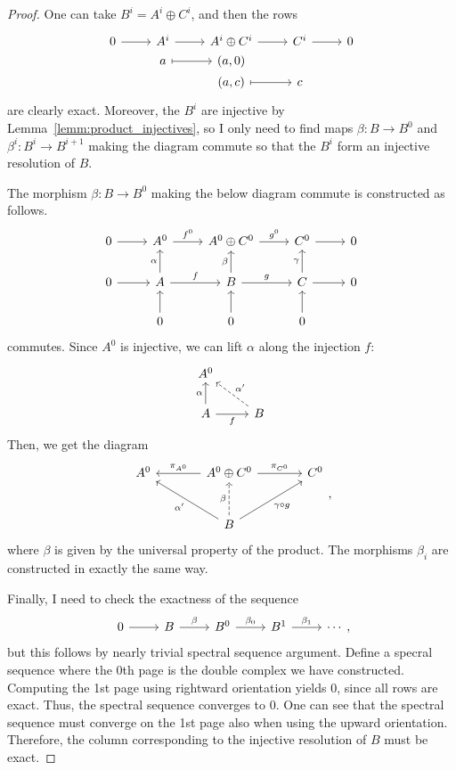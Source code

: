 \begin{proof}
  One can take $B^{i}=A^{i}\oplus C^{i}$, and then the rows
  \[\begin{tikzcd}[row sep=0]
      0\rar & A^{i}\rar & A^{i}\oplus C^{i}\rar & C^{i}\rar & 0 \\
      & a\rar[mapsto] & (a, 0) && \\
      && (a, c)\rar[mapsto] & c &
    \end{tikzcd}\]
  are clearly exact. Moreover, the $B^{i}$ are injective by
  Lemma~\ref{lemm:product_injectives}, so I only need to find maps
  $\beta:B\to B^{0}$ and $\beta^{i}:B^{i}\to B^{i+1}$ making the diagram
  commute so that the $B^{i}$ form an injective resolution of $B$.

  The morphism $\beta:B\to B^{0}$ making the below diagram commute is
  constructed as follows.
  \[\begin{tikzcd}
      0\rar & A^{0}\rar{f^{0}} & A^{0}\oplus C^{0}\rar{g^{0}} & C^{0}\rar & 0 \\
      0\rar & A\rar{f}\uar{\alpha} & B\rar{g}\uar{\beta}
      & C\rar\uar{\gamma} & 0 \\ & 0\uar & 0\uar & 0\uar &
    \end{tikzcd}\]
  commutes. Since $A^{0}$ is injective, we can lift $\alpha$ along the
  injection $f$:
  \[\begin{tikzcd}
      A^{0} & \\ A\arrow[r, "f"']\uar{\alpha}
      & B\arrow[ul, dashed, "\alpha^{\prime}"']
    \end{tikzcd}\]
  Then, we get the diagram
  \[\begin{tikzcd}[row sep=large, column sep=large]
      A^{0} & A^{0}\oplus C^{0}\arrow[l, "\pi_{A^{0}}"']\rar{\pi_{C^{0}}}
      & C^{0} \\ & B\ular{\alpha^{\prime}}\uar[dashed]{\beta}
      \arrow[ur, "\gamma\circ g"']
    \end{tikzcd},\]
  where $\beta$ is given by the universal property of the product.
  The morphisms $\beta_{i}$ are constructed in exactly the same way.

  Finally, I need to check the exactness of the sequence
  \[\begin{tikzcd}
      0\rar & B\rar{\beta} & B^{0}\rar{\beta_{0}} & B^{1}\rar{\beta_{1}} & \cdots
    \end{tikzcd},\]
  but this follows by nearly trivial spectral sequence argument.
  Define a specral sequence where the 0th page is the double complex we have
  constructed. Computing the 1st page using rightward orientation yields 0,
  since all rows are exact. Thus, the spectral sequence converges to 0.
  One can see that the spectral sequence must converge on the 1st page
  also when using the upward orientation. Therefore, the column corresponding
  to the injective resolution of $B$ must be exact.
\end{proof}
